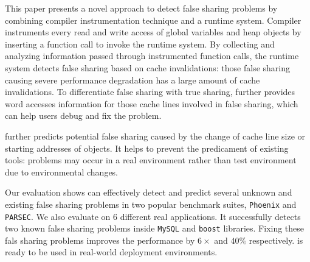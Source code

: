\label{sec:conclusion}
This paper presents a novel approach to detect false sharing problems by combining
compiler instrumentation technique and a runtime system. 
Compiler instruments every read and write access of global variables
and heap objects by inserting a function call to invoke the runtime
system. 
By collecting and analyzing information passed through instrumented function calls, the runtime system 
detects false sharing based on cache invalidations: those 
false sharing causing severe performance degradation has a large amount of 
cache invalidations. To differentiate false sharing with true sharing, 
\Predator{} further provides word accesses information for those cache lines involved in false sharing, 
which can help users debug and fix the problem.

\Predator{} further predicts potential false sharing caused by the change of cache line size 
or starting addresses of objects. It helps to prevent the predicament of existing tools:
problems may occur in a real environment rather than test environment due to environmental changes.

Our evaluation shows \Predator{} can effectively detect and predict several 
unknown and existing false sharing problems 
in two popular benchmark suites, \texttt{Phoenix} and \texttt{PARSEC}. 
We also evaluate \Predator{} on $6$ different real applications. 
It successfully detects two known false sharing problems inside 
\texttt{MySQL} and \texttt{boost} libraries.
Fixing these fals sharing problems improves the performance by $6\times$ and
$40\%$ respectively.
\Predator{} is ready to be used in real-world deployment environments. 
